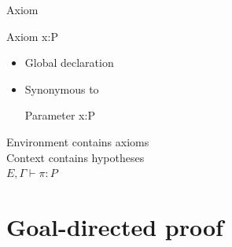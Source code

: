 \begin{frame}[fragile]{Axiom}
	\begin{user}
	Axiom x:P
	\end{user}
	\begin{itemize}
		\item Global declaration
		\pause
		\item Synonymous to
		\begin{user}
		Parameter x:P
		\end{user}
	\end{itemize}
	\pause
	\medskip
	Environment contains axioms\\
	\pause
	\medskip
	Context contains hypotheses\\
	\pause
	\medskip
	$E, \Gamma \vdash \pi : P$
\end{frame}


\section{Goal-directed proof}

